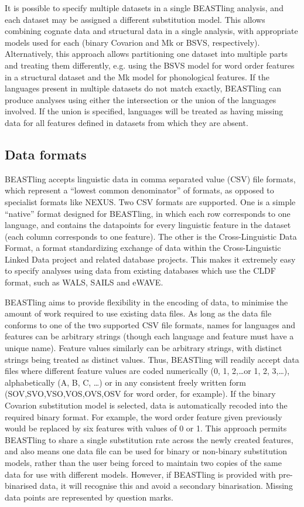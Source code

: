 \documentclass[twocolumn,10pt]{scrartcl}
\begin{document}
It is possible to specify multiple datasets in a single BEASTling analysis, and each dataset may be assigned a different substitution model.  This allows combining cognate data and structural data in a single analysis, with appropriate models used for each (binary Covarion and Mk or BSVS, respectively).  Alternatively, this approach allows partitioning one dataset into multiple parts and treating them differently, e.g. using the BSVS model for word order features in a structural dataset and the Mk model for phonological features.  If the languages present in multiple datasets do not match exactly, BEASTling can produce analyses using either the intersection or the union of the languages involved.  If the union is specified, languages will be treated as having missing data for all features defined in datasets from which they are absent.

\subsection{Data formats}

BEASTling accepts linguistic data in comma separated value (CSV) file formats, which represent a ``lowest common denominator'' of formats, as opposed to specialist formats like NEXUS.  Two CSV formats are supported.  One is a simple ``native'' format designed for BEASTling, in which each row corresponds to one language, and contains the datapoints for every linguistic feature in the dataset (each column corresponds to one feature).  The other is the Cross-Linguistic Data Format, a format standardizing exchange of data within the Cross-Linguistic Linked Data project and related database projects.  This makes it extremely easy to specify analyses using data from existing databases which use the CLDF format, such as WALS, SAILS and eWAVE\cite{Kortmann2013}.

BEASTling aims to provide flexibility in the encoding of data, to minimise the amount of work required to use existing data files.  As long as the data file conforms to one of the two supported CSV file formats, names for languages and features can be arbitrary strings (though each language and feature must have a unique name).  Feature values similarly can be arbitrary strings, with distinct strings being treated as distinct values.  Thus, BEASTling will readily accept data files where different feature values are coded numerically (0, 1, 2,\ldots or 1, 2, 3,\ldots), alphabetically (A, B, C, \ldots) or in any consistent freely written form (SOV,SVO,VSO,VOS,OVS,OSV for word order, for example).  If the binary Covarion substitution model is selected, data is automatically recoded into the required binary format.  For example, the word order feature given previously would be replaced by six features with values of 0 or 1.  This approach permits BEASTling to share a single substitution rate across the newly created features, and also means one data file can be used for binary or non-binary substitution models, rather than the user being forced to maintain two copies of the same data for use with different models.  However, if BEASTling is provided with pre-binarised data, it will recognise this and avoid a secondary binarisation.  Missing data points are represented by question marks.
\end{document}
